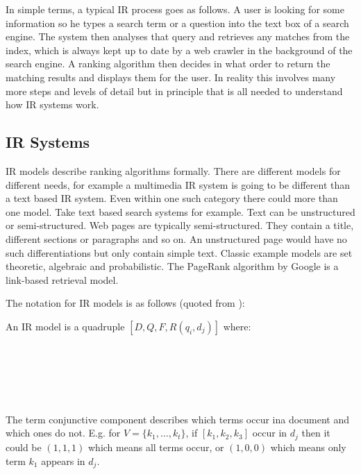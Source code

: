 In simple terms, a typical IR process goes as follows. A user is looking for some information so he types a search term or a question into the text box of a search engine. The system then analyses that query and retrieves any matches from the index, which is always kept up to date by a web crawler in the background of the search engine. A ranking algorithm then decides in what order to return the matching results and displays them for the user. In reality this involves many more steps and levels of detail but in principle that is all needed to understand how IR systems work.

\subsection{IR Systems}

IR models describe ranking algorithms formally. There are different models for different needs, for example a multimedia IR system is going to be different than a text based IR system. Even within one such category there could more than one model. Take text based search systems for example. Text can be unstructured or semi-structured. Web pages are typically semi-structured. They contain a title, different sections or paragraphs and so on. An unstructured page would have no such differentiations but only contain simple text.  Classic example models are set theoretic, algebraic and probabilistic. The PageRank algorithm by Google is a link-based retrieval model.

The notation for IR models is as follows (quoted from \citep[p.58]{Baeza-Yates2011}):


An IR model is a quadruple $[D,Q,F,R(q_{i}, d_{j})]$ where:\\
 \\
 \\
 \\
\\
 \\

The term conjunctive component describes which terms occur ina  document and which ones do not. E.g. for $V =\{k_{1},\ldots, k_{t}\}$, if $[ k_{1},k_{2},k_{3}]$ occur in $d_{j}$ then it could be $(1,1,1)$ which means all terms occur, or $(1,0,0)$ which means only term $k_{1}$ appears in $d_{j}$.

